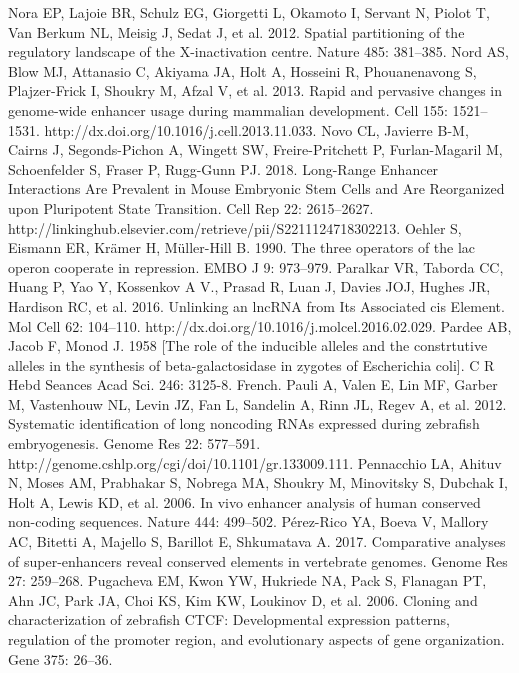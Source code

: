 \begin{thebibliography}{1}
	 Nora EP, Lajoie BR, Schulz EG, Giorgetti L, Okamoto I, Servant N, Piolot T, Van Berkum NL, Meisig J, Sedat J, et al. 2012. Spatial partitioning of the regulatory landscape of the X-inactivation centre. Nature 485: 381–385.
	 Nord AS, Blow MJ, Attanasio C, Akiyama JA, Holt A, Hosseini R, Phouanenavong S, Plajzer-Frick I, Shoukry M, Afzal V, et al. 2013. Rapid and pervasive changes in genome-wide enhancer usage during mammalian development. Cell 155: 1521–1531. http://dx.doi.org/10.1016/j.cell.2013.11.033.
	 Novo CL, Javierre B-M, Cairns J, Segonds-Pichon A, Wingett SW, Freire-Pritchett P, Furlan-Magaril M, Schoenfelder S, Fraser P, Rugg-Gunn PJ. 2018. Long-Range Enhancer Interactions Are Prevalent in Mouse Embryonic Stem Cells and Are Reorganized upon Pluripotent State Transition. Cell Rep 22: 2615–2627. http://linkinghub.elsevier.com/retrieve/pii/S2211124718302213.
	 Oehler S, Eismann ER, Krämer H, Müller-Hill B. 1990. The three operators of the lac operon cooperate in repression. EMBO J 9: 973–979.
	 Paralkar VR, Taborda CC, Huang P, Yao Y, Kossenkov A V., Prasad R, Luan J, Davies JOJ, Hughes JR, Hardison RC, et al. 2016. Unlinking an lncRNA from Its Associated cis Element. Mol Cell 62: 104–110. http://dx.doi.org/10.1016/j.molcel.2016.02.029.
	 Pardee AB, Jacob F, Monod J. 1958 [The role of the inducible alleles and the constrtutive alleles in the synthesis of beta-galactosidase in zygotes of Escherichia coli]. C R Hebd Seances Acad Sci. 246: 3125-8. French.
	 Pauli A, Valen E, Lin MF, Garber M, Vastenhouw NL, Levin JZ, Fan L, Sandelin A, Rinn JL, Regev A, et al. 2012. Systematic identification of long noncoding RNAs expressed during zebrafish embryogenesis. Genome Res 22: 577–591. http://genome.cshlp.org/cgi/doi/10.1101/gr.133009.111.
	 Pennacchio LA, Ahituv N, Moses AM, Prabhakar S, Nobrega MA, Shoukry M, Minovitsky S, Dubchak I, Holt A, Lewis KD, et al. 2006. In vivo enhancer analysis of human conserved non-coding sequences. Nature 444: 499–502.
	 Pérez-Rico YA, Boeva V, Mallory AC, Bitetti A, Majello S, Barillot E, Shkumatava A. 2017. Comparative analyses of super-enhancers reveal conserved elements in vertebrate genomes. Genome Res 27: 259–268.
	 Pugacheva EM, Kwon YW, Hukriede NA, Pack S, Flanagan PT, Ahn JC, Park JA, Choi KS, Kim KW, Loukinov D, et al. 2006. Cloning and characterization of zebrafish CTCF: Developmental expression patterns, regulation of the promoter region, and evolutionary aspects of gene organization. Gene 375: 26–36.

\end{thebibliography}
